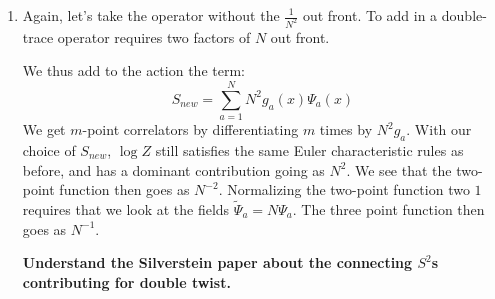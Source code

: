 \documentclass[11pt, class=article, crop=false]{standalone}
\begin{document}
\begin{enumerate}
	Our single trace operator is a product over the distinct $X_i$ fields
	\[
		\Phi_a = \Tr \prod_{i} X_i^{n_i}
	\]
	Each such insertion has $\sum_i n_i$ external legs.
		
	For $\Phi_a$ distinct, we consider:
	\[
		S = N \frac{1}{\lambda} \Tr[d X^i d X^j + c_{ijk} X^i X^j X^k + \dots] + \sum_{a=1}^m N g_a(x)  \Phi_a (x)
	\]
	Here the $g_a$ are taken to be functions of $x$. %
	
	We then compute:
	\[
		\braket{ \prod_{a=1}^m \Phi_a(x_a)} = \frac{1}{N^m} \frac{\delta}{\delta g_1(x_1)} \dots \frac{\delta}{\delta g_m(x_m)}   \log \mathcal Z[\{g_a\}]
	\]
	We can compute vacuum bubbles for this modified action as before. We now get a new vertex type involving the single-trace operator $\Phi_a$. Because it still appears with a coefficient $N$ in the action, we can still apply the same counting logic to the calculation of $\log \mathcal Z$. The spherical contribution dominates.
	
	Thus, again the leading contributions to the free energy goes as $N^{2}$, and we get that the correlator expression behaves as $N^{2-m}$. In particular, the three-point function vanishes as $1/N$, as said in the text. 
	
	
	\item 
	Again, let's take the operator without the $\frac{1}{N^2}$ out front. To add in a double-trace operator requires two factors of $N$ out front. 
	
	We thus add to the action the term:
	\[
		S_{new} = \sum_{a=1}^N N^2 g_a(x) \Psi_a(x)
	\]
	We get $m$-point correlators by differentiating $m$ times by $N^2 g_a$. With our choice of $S_{new}$, $\log Z$ still satisfies the same Euler characteristic rules as before, and has a dominant contribution going as $N^2$. We see that the two-point function then goes as $N^{-2}$. Normalizing the two-point function two $1$ requires that we look at the fields $\tilde \Psi_a = N \Psi_a$. The three point function then goes as $N^{-1}$.
	
	\textbf{Understand the Silverstein paper about the connecting $S^2$s contributing for double twist.}
	

\end{enumerate}
\end{document}
